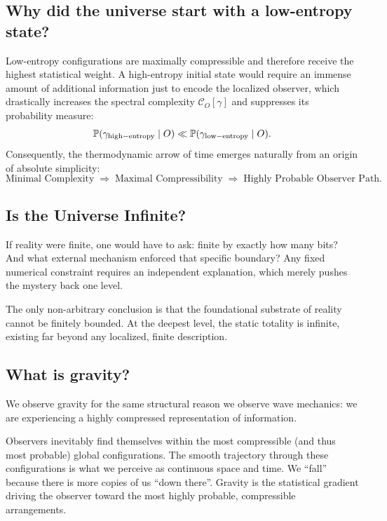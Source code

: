 \subsection*{Why did the universe start with a low-entropy state?}

Low-entropy configurations are maximally compressible and therefore receive the highest statistical weight.
A high-entropy initial state would require an immense amount of additional information just to encode the localized observer, which drastically increases the spectral complexity $\mathcal{C}_O[\gamma]$ and suppresses its probability measure:
\[
\mathbb{P}(\gamma_{\rm high-entropy} \mid O) \ll \mathbb{P}(\gamma_{\rm low-entropy} \mid O).
\]
Consequently, the thermodynamic arrow of time emerges naturally from an origin of absolute simplicity:
\[
\text{Minimal Complexity} \;\Rightarrow\; \text{Maximal Compressibility} \;\Rightarrow\; \text{Highly Probable Observer Path}.
\]


\subsection*{Is the Universe Infinite?}

If reality were finite, one would have to ask: finite by exactly how many bits? And what external mechanism enforced that specific boundary? Any fixed numerical constraint requires an independent explanation, which merely pushes the mystery back one level. 

The only non-arbitrary conclusion is that the foundational substrate of reality cannot be finitely bounded.
At the deepest level, the static totality is infinite, existing far beyond any localized, finite description.


\subsection*{What is gravity?}

We observe gravity for the same structural reason we observe wave mechanics: we are experiencing a highly compressed representation of information. 

Observers inevitably find themselves within the most compressible (and thus most probable) global configurations.
The smooth trajectory through these configurations is what we perceive as continuous space and time.
We ``fall'' because there is more copies of us ``down there''.
Gravity is the statistical gradient driving the observer toward the most highly probable, compressible arrangements.


